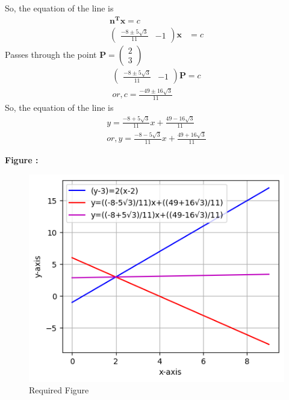 \documentclass[12pt]{article}
\let\vec\mathbf
\begin{document}
So, the equation of the line is
\begin{align}
\vec{n^Tx}=c\\
\begin{pmatrix}
    \frac{-8\pm5\sqrt{3}}{11}&-1
\end{pmatrix}\vec{x}&=c
\end{align}
Passes through the point $\vec{P}=\begin{pmatrix}
    2\\3
\end{pmatrix}$
\begin{align}
\begin{pmatrix}
    \frac{-8\pm5\sqrt{3}}{11}&-1
\end{pmatrix}\vec{P}=c\\
 or,c=\frac{-49\pm16\sqrt{3}}{11}
\end{align}
So, the equation of the line is
\begin{align}
 y=\frac{-8+5\sqrt{3}}{11}x+\frac{49-16\sqrt{3}}{11}\\
or,y=\frac{-8-5\sqrt{3}}{11}x+\frac{49+16\sqrt{3}}{11}    
\end{align}

\textbf{Figure :}
\begin{figure}[H]
    \centering
    \includegraphics[width=\columnwidth]{fig/asgnt1.png}
    \caption{Required Figure}
    \label{fig:fig:1}
\end{figure}
\end{document}

